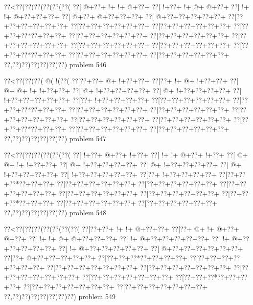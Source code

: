 \vbox{\vbox{\goo
\0??<\0??(\0??(\0??(\0??(\0??(\0??(
\0??[\- @+\0??+\- !+\- !+\- @+\0??+
\0??[\- !+\0??+\- !+\- @+\- @+\0??+
\0??[\- !+\- !+\- @+\0??+\0??+\0??+
\0??[\- @+\0??+\- @+\0??+\0??+\0??+
\0??[\- @+\0??+\0??+\0??+\0??+\0??+
\0??[\0??+\0??+\0??+\0??+\0??+\0??+
\0??[\0??+\0??+\0??+\0??+\0??+\0??+
\0??[\0??+\0??+\0??+\0??+\0??+\0??+
\0??[\0??+\0??+\0??*\0??+\0??+\0??+
\0??[\0??+\0??+\0??+\0??+\0??+\0??+
\0??[\0??+\0??+\0??+\0??+\0??+\0??+
\0??[\0??+\0??+\0??+\0??+\0??+\0??+
\0??[\0??+\0??+\0??+\0??+\0??+\0??+
\0??[\0??+\0??+\0??+\0??+\0??+\0??+
\0??[\0??+\0??+\0??*\0??+\0??+\0??+
\0??[\0??+\0??+\0??+\0??+\0??+\0??+
\0??[\0??+\0??+\0??+\0??+\0??+\0??+
\0??,\0??)\0??)\0??)\0??)\0??)\0??)
}
\hfil problem 546\hfil\break
}

\vbox{\vbox{\goo
\0??<\0??(\0??(\0??(\- @(\- !(\0??(
\0??[\0??+\0??+\- @+\- !+\0??+\0??+
\0??[\0??+\- !+\- @+\- !+\0??+\0??+
\0??[\- @+\- @+\- !+\- !+\0??+\0??+
\0??[\- @+\- !+\0??+\0??+\0??+\0??+
\0??[\- @+\- !+\0??+\0??+\0??+\0??+
\0??[\- !+\0??+\0??+\0??+\0??+\0??+
\0??[\0??+\- !+\0??+\0??+\0??+\0??+
\0??[\0??+\0??+\0??+\0??+\0??+\0??+
\0??[\0??+\0??+\0??*\0??+\0??+\0??+
\0??[\0??+\0??+\0??+\0??+\0??+\0??+
\0??[\0??+\0??+\0??+\0??+\0??+\0??+
\0??[\0??+\0??+\0??+\0??+\0??+\0??+
\0??[\0??+\0??+\0??+\0??+\0??+\0??+
\0??[\0??+\0??+\0??+\0??+\0??+\0??+
\0??[\0??+\0??+\0??*\0??+\0??+\0??+
\0??[\0??+\0??+\0??+\0??+\0??+\0??+
\0??[\0??+\0??+\0??+\0??+\0??+\0??+
\0??,\0??)\0??)\0??)\0??)\0??)\0??)
}
\hfil problem 547\hfil\break
}

\vbox{\vbox{\goo
\0??<\0??(\0??(\0??(\0??(\0??(\0??(
\0??[\- !+\0??+\- @+\0??+\- !+\0??+
\0??[\- !+\- !+\- @+\0??+\- !+\0??+
\0??[\- @+\- @+\- !+\- !+\0??+\0??+
\0??[\- @+\- !+\0??+\0??+\0??+\0??+
\0??[\- @+\- !+\0??+\0??+\0??+\0??+
\0??[\- @+\- !+\0??+\0??+\0??+\0??+
\0??[\- !+\0??+\0??+\0??+\0??+\0??+
\0??[\0??+\- !+\0??+\0??+\0??+\0??+
\0??[\0??+\0??+\0??*\0??+\0??+\0??+
\0??[\0??+\0??+\0??+\0??+\0??+\0??+
\0??[\0??+\0??+\0??+\0??+\0??+\0??+
\0??[\0??+\0??+\0??+\0??+\0??+\0??+
\0??[\0??+\0??+\0??+\0??+\0??+\0??+
\0??[\0??+\0??+\0??+\0??+\0??+\0??+
\0??[\0??+\0??+\0??*\0??+\0??+\0??+
\0??[\0??+\0??+\0??+\0??+\0??+\0??+
\0??[\0??+\0??+\0??+\0??+\0??+\0??+
\0??,\0??)\0??)\0??)\0??)\0??)\0??)
}
\hfil problem 548\hfil\break
}

\vbox{\vbox{\goo
\0??<\0??(\0??(\0??(\0??(\0??(\0??(\0??(
\0??[\0??+\0??+\- !+\- !+\- @+\0??+\0??+
\0??[\0??+\- @+\- !+\- @+\0??+\- @+\0??+
\0??[\- !+\- !+\- @+\- @+\0??+\0??+\0??+
\0??[\- !+\- @+\0??+\0??+\0??+\0??+\0??+
\0??[\- !+\- @+\0??+\0??+\0??+\0??+\0??+
\0??[\- !+\- @+\0??+\0??+\0??+\0??+\0??+
\0??[\- @+\0??+\0??+\0??+\0??+\0??+\0??+
\0??[\0??+\- @+\0??+\0??+\0??+\0??+\0??+
\0??[\0??+\0??+\0??*\0??+\0??+\0??+\0??+
\0??[\0??+\0??+\0??+\0??+\0??+\0??+\0??+
\0??[\0??+\0??+\0??+\0??+\0??+\0??+\0??+
\0??[\0??+\0??+\0??+\0??+\0??+\0??+\0??+
\0??[\0??+\0??+\0??+\0??+\0??+\0??+\0??+
\0??[\0??+\0??+\0??+\0??+\0??+\0??+\0??+
\0??[\0??+\0??+\0??*\0??+\0??+\0??+\0??+
\0??[\0??+\0??+\0??+\0??+\0??+\0??+\0??+
\0??[\0??+\0??+\0??+\0??+\0??+\0??+\0??+
\0??,\0??)\0??)\0??)\0??)\0??)\0??)\0??)
}
\hfil problem 549\hfil\break
}


